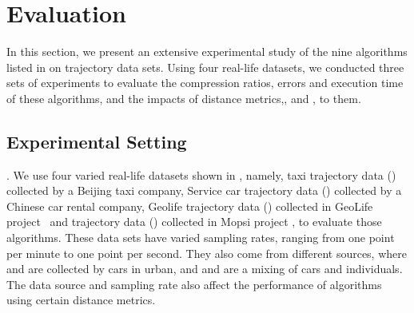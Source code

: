 \section{Evaluation} %
\label{sec-exp}
In this section, we present an extensive experimental study of the nine \lsa algorithms listed in  on trajectory data sets.
Using four real-life datasets, we conducted three sets of experiments to evaluate the compression ratios, errors and execution time of these algorithms, and the impacts of distance metrics,\ie \ped, \sed and \dad, to them.


\vspace{-1ex}
\subsection{Experimental Setting}

.
We use four varied real-life datasets shown in , namely, taxi trajectory data (\taxi) collected by a Beijing taxi company, Service car trajectory data (\ucar) collected by a Chinese car rental company, Geolife trajectory data (\geolife) collected in GeoLife project~\cite{Web:Geolife} and \mopsi trajectory data (\mopsi) collected in Mopsi project \cite{Web:Mopsi}, to evaluate those \lsa algorithms. These data sets have varied sampling rates, ranging from one point per minute to one point per second.
They also come from different sources, where \taxi and \ucar are collected by cars in urban, and \geolife and \mopsi are a mixing of cars and individuals. The data source and sampling rate also affect the performance of \lsa algorithms using certain distance metrics.

